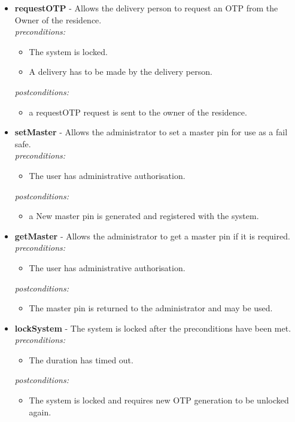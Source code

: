 \documentclass[a4paper,12pt]{article}
\begin{document}
\begin{itemize}
		\item \textbf{requestOTP} - Allows the delivery person to request an OTP from the Owner of the residence.\\[0.5cm]
		\textit{preconditions:}
		\begin{itemize}
			\item The system is locked.
			\item A delivery has to be made by the delivery person.\\[0.5cm]
		\end{itemize}
		
		\textit{postconditions:}
		\begin{itemize}
			\item a requestOTP request is sent to the owner of the residence.
		\end{itemize}
		
		\item \textbf{setMaster} - Allows the administrator to set a master pin for use as a fail safe.\\[0.5cm]
		\textit{preconditions:}
		\begin{itemize}
			\item The user has administrative authorisation.
		\end{itemize}
		
		\textit{postconditions:}
		\begin{itemize}
			\item a New master pin is generated and registered with the system.\\[0.5cm]
		\end{itemize}
		
		\item \textbf{getMaster} - Allows the administrator to get a master pin if it is required.\\[0.5cm]
		\textit{preconditions:}
		\begin{itemize}
			\item The user has administrative authorisation.
		\end{itemize}
		
		\textit{postconditions:}
		\begin{itemize}
			\item The master pin is returned to the administrator and may be used.\\[0.5cm]
		\end{itemize}
		
		\item \textbf{lockSystem} - The system is locked after the preconditions have been met.\\[0.5cm]
		\textit{preconditions:}
		\begin{itemize}
			\item The duration has timed out.
		\end{itemize}
		
		\textit{postconditions:}
		\begin{itemize}
			\item The system is locked and requires new OTP generation to be unlocked again.\\[0.5cm]
		\end{itemize}
	\end{itemize}
\end{document}
